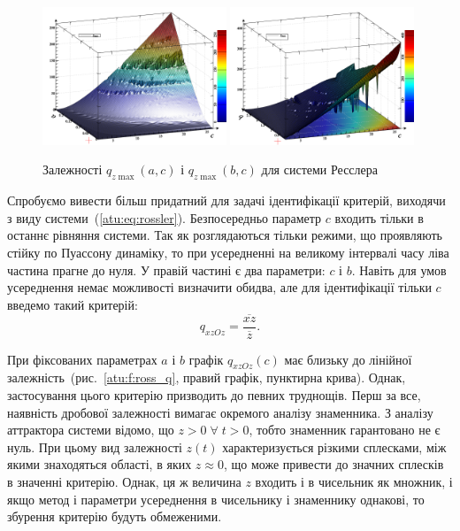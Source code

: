 \begin{figure}[ht!]
\begin{center}
  \includegraphics[width=0.49\textwidth]{p/cha/ross/ross_zmax_a_c.png}
  \hfill
  \includegraphics[width=0.49\textwidth]{p/cha/ross/ross_zmax_b_c.png}
\end{center}
\caption{Залежності $ q_{z \max{}} (a, c) $ і $ q_{z \max{}} (b, c) $ для системи Ресслера}
\label{atu:f:ross_q_zmax_ac_bc}
\end{figure}

Спробуємо вивести більш придатний для задачі ідентифікації
критерій, виходячи з виду системи~(\ref{atu:eq:rossler}). Безпосередньо
параметр
$c$ входить тільки в останнє рівняння системи. Так як
розглядаються тільки режими, що проявляють стійку по Пуассону
динаміку, то при усередненні на великому інтервалі часу ліва
частина прагне до нуля. У правій частині є два параметри: $c$ і
$b$. Навіть для умов усереднення немає можливості визначити
обидва, але для ідентифікації тільки
$c$ введемо такий критерій:
%
\begin{equation}
  q_{xzOz} =
  \frac{ \overline{xz}}{ \overline{z}}.
  \label{atu:eq:ross_qzxOz}
\end{equation}

При фіксованих параметрах
$ a $ і
$ b $ графік
$q_{xzOz}(c)$ має близьку до лінійної залежність~(рис.~\ref{atu:f:ross_q}, правий графік, пунктирна крива).
Однак, застосування цього
критерію призводить до певних труднощів. Перш за все, наявність
дробової залежності вимагає окремого аналізу знаменника. З
аналізу аттрактора системи відомо, що
$ z> 0 \; \forall \; t> 0 $, тобто знаменник гарантовано не є нуль. При цьому
вид залежності
$z(t)$ характеризується різкими сплесками, між якими знаходяться
області, в яких
$ z \approx 0 $, що може привести до значних сплесків в значенні
критерію. Однак, ця ж величина
$z$ входить і в чисельник як множник, і якщо метод і параметри
усереднення в чисельнику і знаменнику однакові, то збурення
критерію будуть обмеженими.


